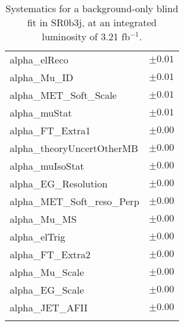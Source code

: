 \begin{table}
\begin{center}
\begin{tabular*}{\textwidth}{@{\extracolsep{\fill}}lc}
alpha\_elReco         & $\pm 0.01$       \\
alpha\_Mu\_ID         & $\pm 0.01$       \\
alpha\_MET\_Soft\_Scale         & $\pm 0.01$       \\
alpha\_muStat         & $\pm 0.01$       \\
alpha\_FT\_Extra1         & $\pm 0.00$       \\
alpha\_theoryUncertOtherMB         & $\pm 0.00$       \\
alpha\_muIsoStat         & $\pm 0.00$       \\
alpha\_EG\_Resolution         & $\pm 0.00$       \\
alpha\_MET\_Soft\_reso\_Perp         & $\pm 0.00$       \\
alpha\_Mu\_MS         & $\pm 0.00$       \\
alpha\_elTrig         & $\pm 0.00$       \\
alpha\_FT\_Extra2         & $\pm 0.00$       \\
alpha\_Mu\_Scale         & $\pm 0.00$       \\
alpha\_EG\_Scale         & $\pm 0.00$       \\
alpha\_JET\_AFII         & $\pm 0.00$       \\
\noalign{\smallskip}\hline\noalign{\smallskip}
\end{tabular*}
\end{center}
\caption{Systematics for a background-only blind fit in SR0b3j, at an integrated luminosity of 3.21 fb$^{-1}$.}
\label{tab:histfitter:syst:bgonly:SR0b3j}
\end{table}
%


